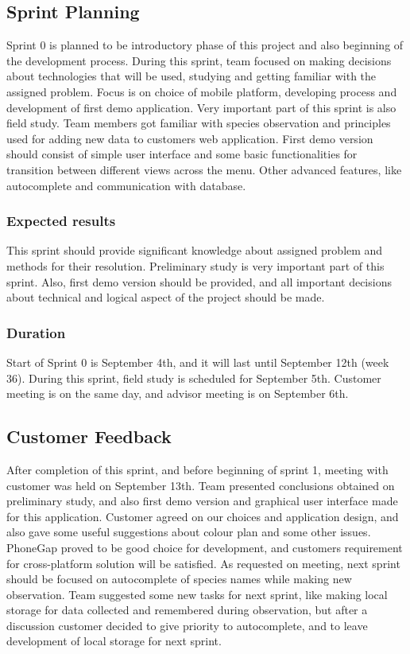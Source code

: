 \subsection{Sprint Planning}
	Sprint 0 is planned to be introductory phase of this project and also beginning of the development process. During this sprint, team focused on making decisions about technologies that will be used, studying and getting familiar with the assigned problem. Focus is on choice of mobile platform, developing process and development of first demo application. Very important part of this sprint is also field study. Team members got familiar with species observation and principles used for adding new data to customers web application. First demo version should consist of simple user interface and some basic functionalities for transition between different views across the menu. Other advanced features, like autocomplete and communication with database.
	
	\subsubsection{Expected results}
	This sprint should provide significant knowledge about assigned problem and methods for their resolution. Preliminary study is very important part of this sprint. Also, first demo version should be provided, and all important decisions about technical and logical aspect of the project should be made.
	
	\subsubsection{Duration}
	Start of Sprint 0 is September 4th, and it will last until September 12th (week 36). During this sprint, field study is scheduled for September 5th. Customer meeting is on the same day, and advisor meeting is on September 6th.
	
	
	
\subsection{Customer Feedback}
	After completion of this sprint, and before beginning of sprint 1, meeting with customer was held on September 13th. Team presented conclusions obtained on preliminary study, and also first demo version and graphical user interface made for this application. Customer agreed on our choices and application design, and also gave some useful suggestions about colour plan and some other issues. PhoneGap proved to be good choice for development, and customers requirement for cross-platform solution will be satisfied. As requested on meeting, next sprint should be focused on autocomplete of species names while making new observation. Team suggested some new tasks for next sprint, like making local storage for data collected and remembered during observation, but after a discussion customer decided to give priority to autocomplete, and to leave development of local storage for next sprint.
	
